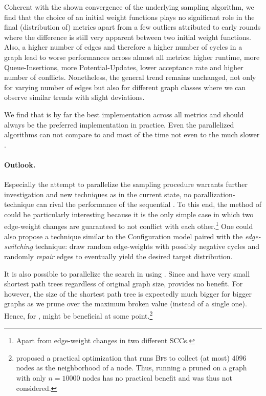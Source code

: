 \bigskip

Coherent with the shown convergence of the underlying sampling algorithm, we find that the choice of an initial weight functions plays no significant role in the final (distribution of) metrics apart from a few outliers attributed to early rounds where the difference is still very apparent between two initial weight functions.
Also, a higher number of edges and therefore a higher number of cycles in a graph lead to worse performances across almost all metrics: higher runtime, more Queue-Insertions, more Potential-Updates, lower acceptance rate and higher number of conflicts.
Nonetheless, the general trend remains unchanged, not only for varying number of edges but also for different graph classes where we can observe similar trends with slight deviations.

We find that \algbp is by far the best implementation across all metrics and should always be the preferred implementation in practice.
Even the parallelized algorithms can not compare to \algbp and most of the time not even to the much slower \algsp.

\bigskip

\paragraph{Outlook.}
Especially the attempt to parallelize the sampling procedure warrants further investigation and new techniques as in the current state, no parallization-technique can rival the performance of the sequential \algbp.
To this end, the method of \algns could be particularly interesting because it is the only simple case in which two edge-weight changes are guaranteed to not conflict with each other.\footnote{
  Apart from edge-weight changes in two different SCCs.
}
One could also propose a technique similar to the Configuration model paired with the \emph{edge-switching} technique: draw random edge-weights with possibly negative cycles and randomly \emph{repair} edges to eventually yield the desired target distribution.

It is also possible to parallelize the search in \algns using \algdt.
Since \algsp and \algbp have very small shortest path trees regardless of original graph size, \algdt provides no benefit.
For \algns however, the size of the shortest path tree is expectedly much bigger for bigger graphs as we prune over the maximum broken value (instead of a single one).
Hence, for \algns, \algdt might be beneficial at some point.\footnote{
  \cite{SteppingAlgorithms} proposed a practical optimization that runs \textsc{Bfs} to collect (at most) $4096$ nodes as the neighborhood of a node.
  Thus, running a pruned \algdt on a graph with only $n = 10000$ nodes has no practical benefit and was thus not considered.
}

